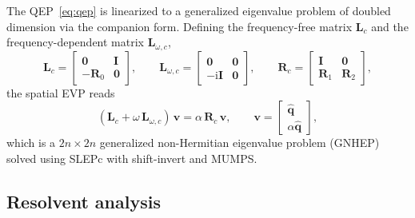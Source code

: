 \documentclass[11pt]{article}
\newcommand{\bq}{\mathbf{q}}
\newcommand{\bI}{\mathbf{I}}
\newcommand{\bL}{\mathbf{L}}
\newcommand{\bR}{\mathbf{R}}
\newcommand{\bv}{\mathbf{v}}
\begin{document}
The QEP~\eqref{eq:qep} is linearized to a generalized eigenvalue problem of doubled dimension via the companion form.
Defining the frequency-free matrix $\bL_c$ and the frequency-dependent matrix $\bL_{\omega,c}$,
\begin{equation}
  \bL_c =
  \begin{bmatrix}
    \bm{0} & \bI \\
    -\bR_0 & \bm{0}
  \end{bmatrix},
  \qquad
  \bL_{\omega,c} =
  \begin{bmatrix}
    \bm{0} & \bm{0} \\
    -\mathrm{i}\bI & \bm{0}
  \end{bmatrix},
  \qquad
  \bR_c =
  \begin{bmatrix}
    \bI & \bm{0} \\
    \bR_1 & \bR_2
  \end{bmatrix},
  \label{eq:companion_matrices}
\end{equation}
the spatial EVP reads
\begin{equation}
  (\bL_c + \omega\,\bL_{\omega,c})\,\bv = \alpha\,\bR_c\,\bv,
  \qquad
  \bv = \begin{bmatrix} \hat{\bq} \\ \alpha\hat{\bq} \end{bmatrix},
  \label{eq:companion}
\end{equation}
which is a $2n\times 2n$ generalized non-Hermitian eigenvalue problem (GNHEP) solved using SLEPc with shift-invert and MUMPS.

\subsection{Resolvent analysis}
\label{sec:resolvent}
\end{document}
